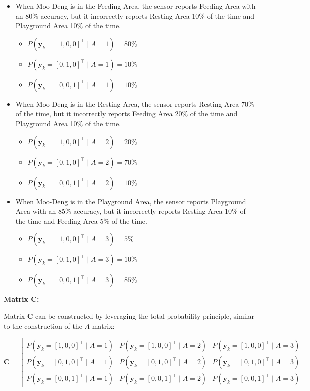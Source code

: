 \begin{enumerate}[a)]
\begin{itemize}
    \item When Moo-Deng is in the Feeding Area, the sensor reports Feeding Area with an 80\% accuracy, but it incorrectly reports Resting Area 10\% of the time and Playground Area 10\% of the time.
    \begin{itemize}
        \item $P(\mathbf{y}_k = [1, 0, 0]^\top \mid A=1) = 80\%$
        \item $P(\mathbf{y}_k = [0, 1, 0]^\top \mid A=1) = 10\%$
        \item $P(\mathbf{y}_k = [0, 0, 1]^\top \mid A=1) = 10\%$
    \end{itemize}
    \item When Moo-Deng is in the Resting Area, the sensor reports Resting Area 70\% of the time, but it incorrectly reports Feeding Area 20\% of the time and Playground Area 10\% of the time.
    \begin{itemize}
        \item $ P(\mathbf{y}_k = [1, 0, 0]^\top \mid A=2) = 20\%$
        \item $P(\mathbf{y}_k = [0, 1, 0]^\top \mid A=2) = 70\%$
        \item $P(\mathbf{y}_k = [0, 0, 1]^\top \mid A=2) = 10\%$
    \end{itemize}
    \item When Moo-Deng is in the Playground Area, the sensor reports Playground Area with an 85\% accuracy, but it incorrectly reports Resting Area 10\% of the time and Feeding Area 5\% of the time.
    \begin{itemize}
        \item $ P(\mathbf{y}_k = [1, 0, 0]^\top \mid A=3) = 5\%$
        \item $P(\mathbf{y}_k = [0, 1, 0]^\top \mid A=3) = 10\%$
        \item $P(\mathbf{y}_k = [0, 0, 1]^\top \mid A=3) = 85\%$
    \end{itemize}
\end{itemize}

\textbf{Matrix \(\mathbf{C}\):}

Matrix \(\mathbf{C}\) can be constructed by leveraging the total probability principle, similar to the construction of the $A$ matrix:


\[
\mathbf{C} = \begin{bmatrix}
P(\mathbf{y}_k = [1, 0, 0]^\top \mid A=1) 
& P(\mathbf{y}_k = [1, 0, 0]^\top \mid A=2) 
& P(\mathbf{y}_k = [1, 0, 0]^\top \mid A=3) \\
P(\mathbf{y}_k = [0, 1, 0]^\top \mid A=1) 
& P(\mathbf{y}_k = [0, 1, 0]^\top \mid A=2)
& P(\mathbf{y}_k = [0, 1, 0]^\top \mid A=3) \\
P(\mathbf{y}_k = [0, 0, 1]^\top \mid A=1)
& P(\mathbf{y}_k = [0, 0, 1]^\top \mid A=2)
& P(\mathbf{y}_k = [0, 0, 1]^\top \mid A=3)
\end{bmatrix}
\]


\end{enumerate}

